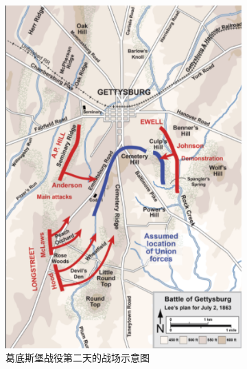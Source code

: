 \documentclass{article}
\begin{document}
\begin{figure}[ht]
  \begin{subfigure}[b]{0.49\linewidth}
    \includegraphics[width=\linewidth]{gettysburg-map.png}
    \caption{葛底斯堡战役第二天的战场示意图}
  \end{subfigure}
  \begin{subfigure}[b]{0.49\linewidth}

\end{subfigure}
\end{figure}
\end{document}
